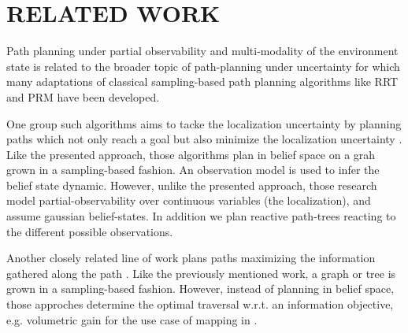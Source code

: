 \documentclass[letterpaper, 10 pt, conference]{ieeeconf}  %
\begin{document}
\section{RELATED WORK}

Path planning under partial observability and multi-modality of the environment state is related to the broader topic of path-planning under uncertainty for which many adaptations of classical sampling-based path planning algorithms like RRT \cite{lavalle1998rapidly} and PRM \cite{kavraki1996probabilistic} have been developed.

One group such algorithms aims to tacke the localization uncertainty by planning paths which not only reach a goal but also minimize the localization uncertainty \cite{prentice2010belief} \cite{bry2011rapidly}. Like the presented approach, those algorithms plan in belief space on a grah grown in a sampling-based fashion. An observation model is used to infer the belief state dynamic. However, unlike the presented approach, those research model partial-observability over continuous variables (the localization), and assume gaussian belief-states. In addition we plan reactive path-trees reacting to the different possible observations.

Another closely related line of work plans paths maximizing the information gathered along the path \cite{hollinger2014sampling} \cite{levine2010information} \cite{dang2020graph}. Like the previously mentioned work, a graph or tree is grown in a sampling-based fashion. However, instead of planning in belief space, those approches determine the optimal traversal w.r.t. an information objective, e.g. volumetric gain for the use case of mapping in \cite{dang2020graph}.
\end{document}
